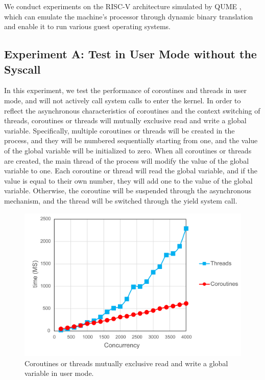 \documentclass[conference]{IEEEtran}
\begin{document}
We conduct experiments on the RISC-V architecture simulated by QUME \cite{bellard2005qemu}, which can emulate the machine's processor through dynamic binary translation and enable it to run various guest operating systems. 

\subsection{Experiment A: Test in User Mode without the Syscall}\label{AA}

In this experiment, we test the performance of coroutines and threads in user mode, and will not actively call system calls to enter the kernel. In order to reflect the asynchronous characteristics of coroutines and the context switching of threads, coroutines or threads will mutually exclusive read and write a global variable. Specifically, multiple coroutines or threads will be created in the process, and they will be numbered sequentially starting from one, and the value of the global variable will be initialized to zero. When all coroutines or threads are created, the main thread of the process will modify the value of the global variable to one. Each coroutine or thread will read the global variable, and if the value is equal to their own number, they will add one to the value of the global variable. Otherwise, the coroutine will be suspended through the asynchronous mechanism, and the thread will be switched through the yield system call.

\begin{figure}[htbp]
\centerline{\includegraphics[width=\columnwidth]{user.png}}
\caption{Coroutines or threads mutually exclusive read and write a global variable in user mode.}
\label{user}
\end{figure}
\end{document}

